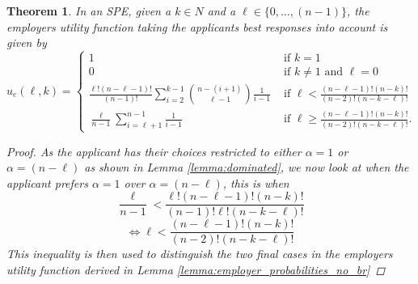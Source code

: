\documentclass{article}
\newtheorem{theorem}{Theorem}
\begin{document}
\begin{theorem}
    In an SPE, given a $k \in N$ and a $\ell \in \{ 0, \ldots , (n-1) \}$, the employers utility function taking the applicants best responses into account is given by 
$$
    u_e(\ell,k) = 
\begin{cases}
    1 & \text{ if } k = 1 \\
    0 & \text{ if } k \neq 1 \text{ and } \ell = 0 \\
    \frac{\ell!(n-\ell-1)!}{(n-1)!}\sum_{i = 2}^{k-1}\binom{n-(i+1)}{\ell-1}\frac{1}{i-1} & \text{ if } \ell < \frac{(n-\ell-1)!(n-k)!}{(n-2)!(n-k-\ell)!} \\
    \frac{\ell}{n-1}\sum_{i = \ell + 1}^{n-1}\frac{1}{i-1} & \text{ if } \ell \geq \frac{(n-\ell-1)!(n-k)!}{(n-2)!(n-k-\ell)!}.
\end{cases}
$$
\begin{proof}\label{theorem:employer_utlity_best_response}
As the applicant has their choices restricted to either $\alpha=1$ or $\alpha = (n-\ell)$ as shown in Lemma \ref{lemma:dominated}, we now look at when the applicant prefers  $\alpha=1$ over $\alpha = (n-\ell)$, this is when $$ \frac{\ell}{n-1} < \frac{\ell!(n-\ell-1)!(n-k)!}{(n-1)!\ell!(n-k-\ell)!}$$
$$ \iff \ell < \frac{(n-\ell-1)!(n-k)!}{(n-2)!(n-k-\ell)!}$$
This inequality is then used to distinguish the two final cases in the employers utility function derived in Lemma \ref{lemma:employer_probabilities_no_br}
\end{proof}
\end{theorem}
\end{document}
